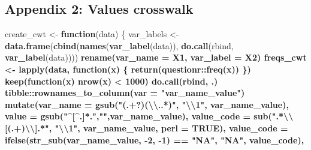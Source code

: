 \documentclass[12pt,]{article}
\newenvironment{Shaded}{\begin{snugshade}}{\end{snugshade}}
\newcommand{\CharTok}[1]{\textcolor[rgb]{0.31,0.60,0.02}{#1}}
\newcommand{\ControlFlowTok}[1]{\textcolor[rgb]{0.13,0.29,0.53}{\textbf{#1}}}
\newcommand{\DataTypeTok}[1]{\textcolor[rgb]{0.13,0.29,0.53}{#1}}
\newcommand{\DecValTok}[1]{\textcolor[rgb]{0.00,0.00,0.81}{#1}}
\newcommand{\KeywordTok}[1]{\textcolor[rgb]{0.13,0.29,0.53}{\textbf{#1}}}
\newcommand{\NormalTok}[1]{#1}
\newcommand{\OperatorTok}[1]{\textcolor[rgb]{0.81,0.36,0.00}{\textbf{#1}}}
\newcommand{\OtherTok}[1]{\textcolor[rgb]{0.56,0.35,0.01}{#1}}
\newcommand{\StringTok}[1]{\textcolor[rgb]{0.31,0.60,0.02}{#1}}
\begin{document}
\normalsize

\hypertarget{appendix2}{%
\subsection{Appendix 2: Values crosswalk}\label{appendix2}}

\scriptsize

\begin{Shaded}
\begin{Highlighting}[]
\NormalTok{create_cwt <-}\StringTok{ }\ControlFlowTok{function}\NormalTok{(data) \{}
\NormalTok{  var_labels <-}\StringTok{ }\KeywordTok{data.frame}\NormalTok{(}\KeywordTok{cbind}\NormalTok{(}\KeywordTok{names}\NormalTok{(}\KeywordTok{var_label}\NormalTok{(data)), }\KeywordTok{do.call}\NormalTok{(rbind, }\KeywordTok{var_label}\NormalTok{(data)))) }\OperatorTok{%
\StringTok{    }\KeywordTok{rename}\NormalTok{(}\DataTypeTok{var_name =}\NormalTok{ X1, }\DataTypeTok{var_label =}\NormalTok{ X2)}
\NormalTok{  freqs_cwt <-}\StringTok{ }\KeywordTok{lapply}\NormalTok{(data, }\ControlFlowTok{function}\NormalTok{(x) \{ }\KeywordTok{return}\NormalTok{(questionr}\OperatorTok{::}\KeywordTok{freq}\NormalTok{(x)) \}) }\OperatorTok{%
\StringTok{    }\KeywordTok{keep}\NormalTok{(}\ControlFlowTok{function}\NormalTok{(x) }\KeywordTok{nrow}\NormalTok{(x) }\OperatorTok{<}\StringTok{ }\DecValTok{1000}\NormalTok{) }\OperatorTok{%
\StringTok{    }\KeywordTok{do.call}\NormalTok{(rbind, .) }\OperatorTok{%
\StringTok{    }\NormalTok{tibble}\OperatorTok{::}\KeywordTok{rownames_to_column}\NormalTok{(}\DataTypeTok{var =} \StringTok{"var_name_value"}\NormalTok{) }\OperatorTok{%
\StringTok{    }\KeywordTok{mutate}\NormalTok{(}\DataTypeTok{var_name =} \KeywordTok{gsub}\NormalTok{(}\StringTok{"(.+?)(}\CharTok{\textbackslash{}\textbackslash{}}\StringTok{..*)"}\NormalTok{, }\StringTok{"}\CharTok{\textbackslash{}\textbackslash{}}\StringTok{1"}\NormalTok{, var_name_value),}
           \DataTypeTok{value =} \KeywordTok{gsub}\NormalTok{(}\StringTok{"^[^.]*."}\NormalTok{,}\StringTok{""}\NormalTok{,var_name_value),}
           \DataTypeTok{value_code =} \KeywordTok{sub}\NormalTok{(}\StringTok{".*}\CharTok{\textbackslash{}\textbackslash{}}\StringTok{[(.+)}\CharTok{\textbackslash{}\textbackslash{}}\StringTok{].*"}\NormalTok{, }\StringTok{"}\CharTok{\textbackslash{}\textbackslash{}}\StringTok{1"}\NormalTok{, var_name_value, }\DataTypeTok{perl =} \OtherTok{TRUE}\NormalTok{),}
           \DataTypeTok{value_code =} \KeywordTok{ifelse}\NormalTok{(}\KeywordTok{str_sub}\NormalTok{(var_name_value, }\DecValTok{-2}\NormalTok{, }\DecValTok{-1}\NormalTok{) }\OperatorTok{==}\StringTok{ "NA"}\NormalTok{, }\StringTok{"NA"}\NormalTok{, value_code),}
}}}}}
\end{Highlighting}
\end{Shaded}
\end{document}
